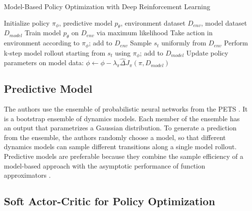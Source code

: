 \documentclass{article}
\begin{document}
\begin{algorithm}
\caption{Model-Based Policy Optimization with Deep Reinforcement Learning}\label{euclid}
\begin{algorithmic}[1]
\State Initialize policy $\pi_{\phi}$, predictive model $p_{\theta}$, environment dataset $D_{env}$, model dataset $D_{model}$
\State Train model $p_{\theta}$ on $D_{env}$ via maximum likelihood
\State Take action in environment according to $\pi_{\phi}$; add to $D_{env}$
\State Sample $s_{t}$ uniformly from $D_{env}$
\State Perform k-step model rollout starting from $s_{t}$ using $\pi_{\phi}$; add to $D_{model}$
\EndFor
{}
\State Update policy parameters on model data: $\phi \leftarrow \phi - \lambda_{\pi} \hat{\Delta} J_{\pi}(\pi, D_{model})$
\EndFor
\EndFor
\EndFor
\end{algorithmic}
\end{algorithm}

\subsection{Predictive Model}

The authors use the ensemble of probabilistic neural networks from the PETS \cite{ref6}. It is a bootstrap ensemble of dynamics models. Each member of the ensemble has an output that parametrizes a Gaussian distribution. To generate a prediction from the ensemble, the authors randomly choose a model, so that different dynamics models can sample different transitions along a single model rollout. Predictive models are preferable because they combine the sample efficiency of a model-based approach with the asymptotic performance of function approximators \cite{ref7}.

\subsection{Soft Actor-Critic for Policy Optimization}
\end{document}
